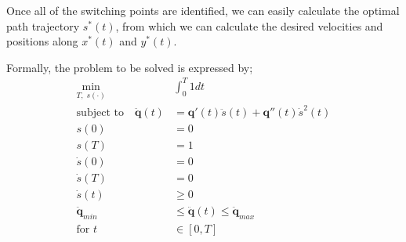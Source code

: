 Once all of the switching points are identified, we can easily calculate the optimal path trajectory $s^*(t)$, from which we can calculate the desired velocities and positions along $x^*(t)$ and $y^	*(t)$.

Formally, the problem to be solved is expressed by;
\begin{align*}
\min_{T, \; s(\cdot)} \;& \int_0^T1dt\\
\text{subject to} \quad \ddot{\textbf{q}}(t) &= \textbf{q}'(t)\ddot{s}(t) + \textbf{q}''(t)\dot{s}^2(t)\\
s(0) &= 0\\
s(T) &= 1\\
\dot{s}(0) &= 0\\
\dot{s}(T) &= 0\\
\dot{s}(t) &\geq 0\\
\ddot{\textbf{q}}_{min} &\leq \ddot{\textbf{q}}(t) \leq \ddot{\textbf{q}}_{max}\\
\text{for } t &\in [0,T]\\
\end{align*}